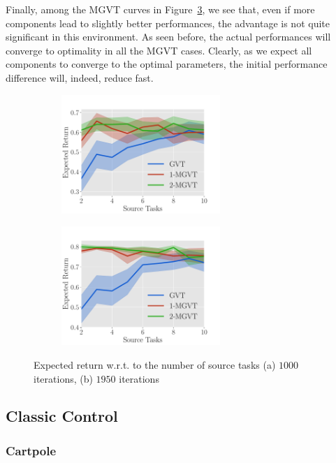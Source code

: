 \documentclass{article}
\begin{document}
Finally, among the MGVT curves in Figure~\ref{fig:sequential}, we see that, even if more components lead to slightly better performances, the advantage is not quite significant in this environment. As seen before, the actual performances will converge to optimality in all the MGVT cases. Clearly, as we expect all components to converge to the optimal parameters, the initial performance difference will, indeed, reduce fast.

\begin{figure}[t]
  \begin{subfigure}[b]{0.45\textwidth}
    \includegraphics[trim=0.0cm 0cm 1.2cm 1.3cm,clip=true,height=4.5cm]{images/sequential/lrew_1000.pdf}
    \caption{}
    \label{fig:seq-1000}
  \end{subfigure}
  \begin{subfigure}[b]{0.45\textwidth}
    \includegraphics[trim=0.0cm 0cm 1.2cm 1.3cm,clip=true,height=4.5cm]{images/sequential/lrew_1950.pdf}
    \caption{}
    \label{fig:seq-1950}
  \end{subfigure}
  \caption{Expected return w.r.t. to the number of source tasks (a) $1000$ iterations, (b) $1950$ iterations}
  \label{fig:sequential}
\end{figure}


\subsection{Classic Control}

\subsubsection{Cartpole}
\end{document}
